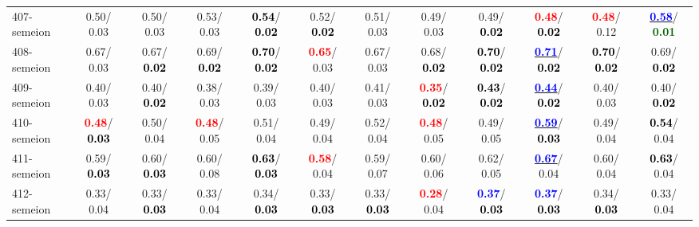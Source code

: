 \begin{table}[h]
\begin{center}
{\begin{tabular}{lc|c|c|c|c|c|c|c|c|c|c}
407-semeion &   0.50/  0.03 &   0.50/  0.03 &   0.53/  0.03 & \textcolor{black}{\textbf{  0.54}}/\textcolor{black}{\textbf{  0.02}} &   0.52/\textcolor{black}{\textbf{  0.02}} &   0.51/  0.03 &   0.49/  0.03 &   0.49/\textcolor{black}{\textbf{  0.02}} & \textcolor{red}{\textbf{  0.48}}/\textcolor{black}{\textbf{  0.02}} & \textcolor{red}{\textbf{  0.48}}/  0.12 & \underline{\textcolor{blue}{\textbf{  0.58}}}/\textcolor{darkgreen}{\textbf{  0.01}} \\
408-semeion &   0.67/  0.03 &   0.67/\textcolor{black}{\textbf{  0.02}} &   0.69/\textcolor{black}{\textbf{  0.02}} & \textcolor{black}{\textbf{  0.70}}/\textcolor{black}{\textbf{  0.02}} & \textcolor{red}{\textbf{  0.65}}/  0.03 &   0.67/  0.03 &   0.68/\textcolor{black}{\textbf{  0.02}} & \textcolor{black}{\textbf{  0.70}}/\textcolor{black}{\textbf{  0.02}} & \underline{\textcolor{blue}{\textbf{  0.71}}}/\textcolor{black}{\textbf{  0.02}} & \textcolor{black}{\textbf{  0.70}}/\textcolor{black}{\textbf{  0.02}} &   0.69/\textcolor{black}{\textbf{  0.02}} \\
409-semeion &   0.40/  0.03 &   0.40/\textcolor{black}{\textbf{  0.02}} &   0.38/  0.03 &   0.39/  0.03 &   0.40/  0.03 &   0.41/  0.03 & \textcolor{red}{\textbf{  0.35}}/\textcolor{black}{\textbf{  0.02}} & \textcolor{black}{\textbf{  0.43}}/\textcolor{black}{\textbf{  0.02}} & \underline{\textcolor{blue}{\textbf{  0.44}}}/\textcolor{black}{\textbf{  0.02}} &   0.40/  0.03 &   0.40/\textcolor{black}{\textbf{  0.02}} \\
410-semeion & \textcolor{red}{\textbf{  0.48}}/\textcolor{black}{\textbf{  0.03}} &   0.50/  0.04 & \textcolor{red}{\textbf{  0.48}}/  0.05 &   0.51/  0.04 &   0.49/  0.04 &   0.52/  0.04 & \textcolor{red}{\textbf{  0.48}}/  0.05 &   0.49/  0.05 & \underline{\textcolor{blue}{\textbf{  0.59}}}/\textcolor{black}{\textbf{  0.03}} &   0.49/  0.04 & \textcolor{black}{\textbf{  0.54}}/  0.04 \\
411-semeion &   0.59/\textcolor{black}{\textbf{  0.03}} &   0.60/\textcolor{black}{\textbf{  0.03}} &   0.60/  0.08 & \textcolor{black}{\textbf{  0.63}}/\textcolor{black}{\textbf{  0.03}} & \textcolor{red}{\textbf{  0.58}}/  0.04 &   0.59/  0.07 &   0.60/  0.06 &   0.62/  0.05 & \underline{\textcolor{blue}{\textbf{  0.67}}}/  0.04 &   0.60/  0.04 & \textcolor{black}{\textbf{  0.63}}/  0.04 \\
412-semeion &   0.33/  0.04 &   0.33/\textcolor{black}{\textbf{  0.03}} &   0.33/  0.04 &   0.34/\textcolor{black}{\textbf{  0.03}} &   0.33/\textcolor{black}{\textbf{  0.03}} &   0.33/\textcolor{black}{\textbf{  0.03}} & \textcolor{red}{\textbf{  0.28}}/  0.04 & \textcolor{blue}{\textbf{  0.37}}/\textcolor{black}{\textbf{  0.03}} & \textcolor{blue}{\textbf{  0.37}}/\textcolor{black}{\textbf{  0.03}} &   0.34/\textcolor{black}{\textbf{  0.03}} &   0.33/  0.04 \\ \hline

\end{tabular}}
\end{center}
\end{table}
